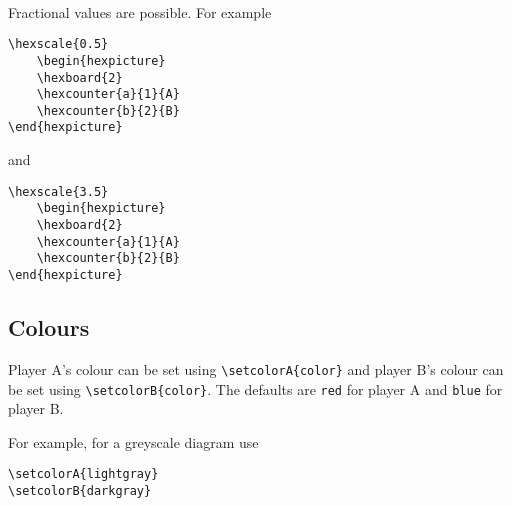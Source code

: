 \documentclass[a4paper,12pt]{article}
\begin{document}
    \begin{hexpicture}
    \end{hexpicture}\\
    
    Fractional values are possible. For example
    
    \begin{verbatim}\hexscale{0.5}
    \begin{hexpicture}
    \hexboard{2}
    \hexcounter{a}{1}{A}
    \hexcounter{b}{2}{B}
\end{hexpicture}\end{verbatim}
    
    \begin{hexpicture}
    \end{hexpicture}

    and

    \begin{verbatim}\hexscale{3.5}
    \begin{hexpicture}
    \hexboard{2}
    \hexcounter{a}{1}{A}
    \hexcounter{b}{2}{B}
\end{hexpicture}\end{verbatim}
    
    \begin{hexpicture}
    \end{hexpicture}

    
    \subsection{Colours}
    
    Player A's colour can be set using \verb|\setcolorA{color}| and player B's colour can be set using \verb|\setcolorB{color}|. The defaults are \verb|red| for player A and \verb|blue| for player B.
    
    For example, for a greyscale diagram use
    
    \begin{verbatim}\setcolorA{lightgray}
\setcolorB{darkgray}\end{verbatim}
    
\end{document}
